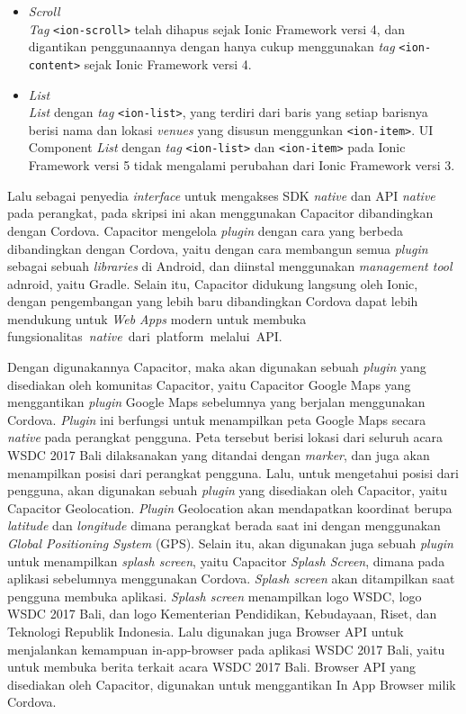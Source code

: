 \begin{enumerate}
\begin{itemize}
			\item \textit{Scroll} \\
			\textit{Tag} \texttt{<ion-scroll>} telah dihapus sejak Ionic Framework versi 4, dan digantikan penggunaannya dengan hanya cukup menggunakan \textit{tag} \texttt{<ion-content>} sejak Ionic Framework versi 4.
		
			\item \textit{List} \\
		\textit{List} dengan \textit{tag} \texttt{<ion-list>}, yang terdiri dari baris yang setiap barisnya berisi nama dan lokasi \textit{venues} yang disusun menggunkan \texttt{<ion-item>}. UI Component \textit{List} dengan \textit{tag} \texttt{<ion-list>} dan \texttt{<ion-item>} pada Ionic Framework versi 5 tidak mengalami perubahan dari Ionic Framework versi 3.
		\end{itemize}


Lalu sebagai penyedia \textit{interface} untuk mengakses SDK \textit{native} dan API \textit{native} pada perangkat, pada skripsi ini akan menggunakan Capacitor dibandingkan dengan Cordova. Capacitor mengelola \textit{plugin} dengan cara yang berbeda dibandingkan dengan Cordova, yaitu dengan cara membangun semua \textit{plugin} sebagai sebuah \textit{libraries} di Android, dan diinstal menggunakan \textit{management tool} adnroid, yaitu Gradle. Selain itu, Capacitor didukung langsung oleh Ionic, dengan pengembangan yang lebih baru dibandingkan Cordova dapat lebih mendukung untuk \textit{Web Apps} modern untuk membuka fungsionalitas~\textit{native}~dari~platform~melalui~API.

Dengan digunakannya Capacitor, maka akan digunakan sebuah \textit{plugin} yang disediakan oleh komunitas Capacitor, yaitu Capacitor Google Maps yang menggantikan \textit{plugin} Google Maps sebelumnya yang berjalan menggunakan Cordova. \textit{Plugin} ini berfungsi untuk menampilkan peta Google Maps secara \textit{native} pada perangkat pengguna. Peta tersebut berisi lokasi dari seluruh acara WSDC 2017 Bali dilaksanakan yang ditandai dengan \textit{marker}, dan juga akan menampilkan posisi dari perangkat pengguna. Lalu, untuk mengetahui posisi dari pengguna, akan digunakan sebuah \textit{plugin} yang disediakan oleh Capacitor, yaitu Capacitor Geolocation. \textit{Plugin} Geolocation akan mendapatkan koordinat berupa \textit{latitude} dan \textit{longitude} dimana perangkat berada saat ini dengan menggunakan \textit{Global Positioning System} (GPS). Selain itu, akan digunakan juga sebuah \textit{plugin} untuk menampilkan \textit{splash screen}, yaitu Capacitor \textit{Splash Screen}, dimana pada aplikasi sebelumnya menggunakan Cordova. \textit{Splash screen} akan ditampilkan saat pengguna membuka aplikasi. \textit{Splash screen} menampilkan logo WSDC, logo WSDC 2017 Bali, dan logo Kementerian Pendidikan, Kebudayaan, Riset, dan Teknologi Republik Indonesia. Lalu digunakan juga Browser API untuk menjalankan kemampuan in-app-browser pada aplikasi WSDC 2017 Bali, yaitu untuk membuka berita terkait acara WSDC 2017 Bali. Browser API yang disediakan oleh Capacitor, digunakan untuk menggantikan In App Browser milik Cordova.
\end{enumerate}


